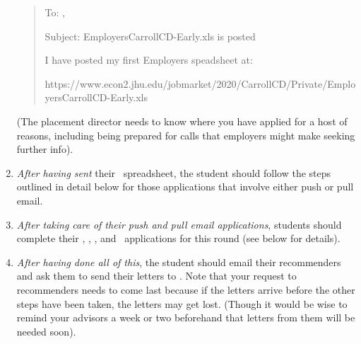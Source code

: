 \documentclass{econtex}
\newcommand\redout{\bgroup\markoverwith
{\textcolor{red}{\rule[.5ex]{2pt}{1pt}}}\ULon}
\begin{document}
\begin{enumerate}
\begin{quote}
  \begin{texttt}
    To: \JMStaffEmail , \JMPOEmail
    
    Subject: EmployersCarrollCD-Early.xls is posted

    \indent I have posted my first Employers speadsheet at:

    https://www.econ2.jhu.edu/jobmarket/2020/CarrollCD/Private/EmployersCarrollCD-Early.xls
    
    \end{texttt}
\end{quote}    

  (The placement director needs to know where you have applied for a host of reasons, including being prepared for calls that employers might make seeking further info).


\item {\it After having sent} their \EMW~spreadsheet, the student
  should follow the steps outlined in detail below for those
  applications that involve either push or pull email.

\item {\it After taking care of their push and pull email applications}, students should complete their \EJM, \AJO, \AEA, and \Interfolio~applications for this round (see below for details).

\item {\it After having done all of this}, the student should email
  their recommenders and ask them to send their letters to
  \JMStaffEmail.  Note that your request to recommenders needs to come
  last because if the letters arrive before the other steps have been
  taken, the letters may get lost.  (Though it would be wise to remind
  your advisors a week or two beforehand that letters from them will
  be needed soon).

\end{enumerate}
\end{document}
